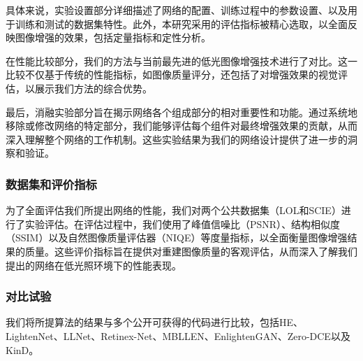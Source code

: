 \documentclass[a4paper]{ctexart}
\begin{document}
	具体来说，实验设置部分详细描述了网络的配置、训练过程中的参数设置、以及用于训练和测试的数据集特性。此外，本研究采用的评估指标被精心选取，以全面反映图像增强的效果，包括定量指标和定性分析。
	
	在性能比较部分，我们的方法与当前最先进的低光图像增强技术进行了对比。这一比较不仅基于传统的性能指标，如图像质量评分，还包括了对增强效果的视觉评估，以展示我们方法的综合优势。
	
	最后，消融实验部分旨在揭示网络各个组成部分的相对重要性和功能。通过系统地移除或修改网络的特定部分，我们能够评估每个组件对最终增强效果的贡献，从而深入理解整个网络的工作机制。这些实验结果为我们的网络设计提供了进一步的洞察和验证。
	
	\subsubsection{数据集和评价指标}
	
	为了全面评估我们所提出网络的性能，我们对两个公共数据集（LOL\cite{wei2018deep}和SCIE\cite{cai2018learning}）进行了实验评估。在评估过程中，我们使用了峰值信噪比（PSNR）\cite{wang2004image}、结构相似度（SSIM）\cite{wang2004image}以及自然图像质量评估器（NIQE）\cite{mittal2012making}等度量指标，以全面衡量图像增强结果的质量。这些评价指标旨在提供对重建图像质量的客观评估，从而深入了解我们提出的网络在低光照环境下的性能表现。
	
	\subsubsection{对比试验}
	
	我们将所提算法的结果与多个公开可获得的代码进行比较，包括HE\cite{pisano1998contrast}、LightenNet\cite{li2018lightennet}、LLNet\cite{lore2017llnet}、Retinex-Net\cite{wei2018deep}、MBLLEN\cite{lv2018mbllen}、EnlightenGAN\cite{jiang2021enlightengan}、Zero-DCE\cite{guo2020zero}以及KinD\cite{zhang2019kindling}。
	
\end{document}
